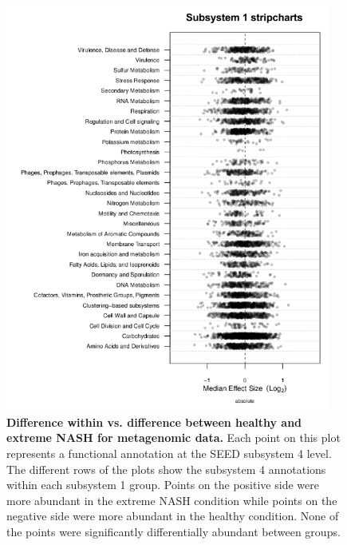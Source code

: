 \begin{figure}[h]
\begin{center}
\includegraphics[width=0.95\textwidth]{metagenomic_subsys1.png}
\caption[Difference within vs. difference between healthy and extreme NASH for metagenomic data.]{\textbf{Difference within vs. difference between healthy and extreme NASH for metagenomic data.} Each point on this plot represents a functional annotation at the SEED subsystem 4 level. The different rows of the plots show the subsystem 4 annotations within each subsystem 1 group. Points on the positive side were more abundant in the extreme NASH condition while points on the negative side were more abundant in the healthy condition. None of the points were significantly differentially abundant between groups.}
\label{nafld_metagenomic_subsys1}
\end{center}
\end{figure}

